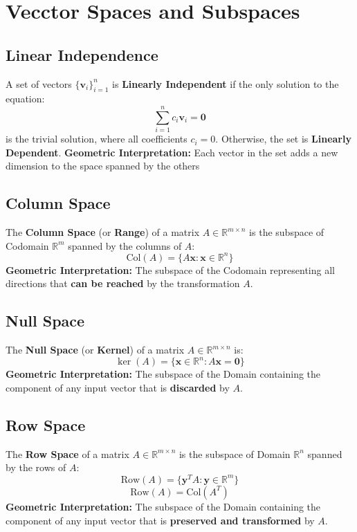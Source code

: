 \documentclass{article}
\begin{document}
\section{Vecctor Spaces and Subspaces}

\subsection{Linear Independence}
A set of vectors $\{\mathbf{v}_i\}_{i=1}^n$ is \textbf{Linearly Independent} if the only solution to the equation:
\[
    \sum_{i=1}^{n} c_i \mathbf{v}_i = \mathbf{0}
\]
is the trivial solution, where all coefficients $c_i = 0$. Otherwise, the set is \textbf{Linearly Dependent}.
\newline
\textbf{Geometric Interpretation:} Each vector in the set adds a new dimension to the space spanned by the others

\subsection{Column Space}
The \textbf{Column Space} (or \textbf{Range}) of a matrix $A \in \mathbb{R}^{m \times n}$ is the subspace of Codomain $\mathbb{R}^m$ spanned by the columns of $A$:
\[
    \text{Col}(A) = \{ A\mathbf{x} : \mathbf{x} \in \mathbb{R}^n \}
\]
\textbf{Geometric Interpretation:} The subspace of the Codomain representing all directions that \textbf{can be reached} by the transformation $A$.

\subsection{Null Space}
The \textbf{Null Space} (or \textbf{Kernel}) of a matrix $A \in \mathbb{R}^{m \times n}$ is:
\[
    \ker(A) = \{ \mathbf{x} \in \mathbb{R}^n : A\mathbf{x} = \mathbf{0} \}
\]
\textbf{Geometric Interpretation:} The subspace of the Domain containing the component of any input vector that is \textbf{discarded} by $A$.

\subsection{Row Space}
The \textbf{Row Space} of a matrix $A \in \mathbb{R}^{m \times n}$ is the subspace of Domain $\mathbb{R}^n$ spanned by the rows of $A$:
\[
    \text{Row}(A) = \{ \mathbf{y}^T A : \mathbf{y} \in \mathbb{R}^m \}
\]
\[
    \text{Row}(A) = \text{Col}(A^T)
\]
\textbf{Geometric Interpretation:} The subspace of the Domain containing the component of any input vector that is \textbf{preserved and transformed} by $A$.
\end{document}
